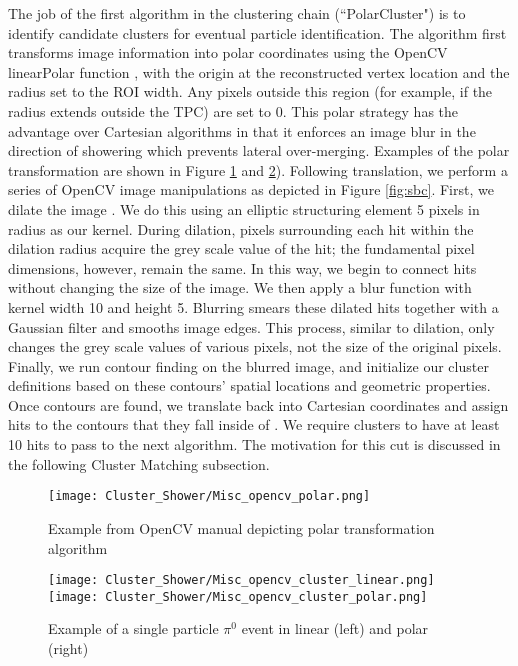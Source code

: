 \par The job of the first algorithm in the clustering chain (``PolarCluster") is to identify candidate clusters for eventual particle identification. The algorithm first transforms image information into polar coordinates using the OpenCV linearPolar function \cite{bib:linearPolar}, with the origin at the reconstructed vertex location and the radius set to the ROI width.  Any pixels outside this region (for example, if the radius extends outside the TPC) are set to 0. This polar strategy has the advantage over Cartesian algorithms in that it enforces an image blur in the direction of showering which prevents lateral over-merging. Examples of the polar transformation are shown in Figure \ref{fig:polar} and \ref{fig:pi0_polar}). Following translation, we perform a series of OpenCV image manipulations as depicted in Figure \ref{fig:sbc}. First, we dilate the image \cite{bib:dilate}. We do this using an elliptic structuring element \cite{bib:structuringElement} 5 pixels in radius as our kernel. During dilation, pixels surrounding each hit within the dilation radius acquire the grey scale value of the hit; the fundamental pixel dimensions, however, remain the same. In this way, we begin to connect hits without changing the size of the image. We then apply a blur function \cite{bib:blur} with kernel width 10 and height 5. Blurring smears these dilated hits together with a Gaussian filter and smooths image edges. This process, similar to dilation, only changes the grey scale values of various pixels, not the size of the original pixels. Finally, we run contour finding \cite{bib:contourFinding} on the blurred image, and initialize our cluster definitions based on these contours' spatial locations and geometric properties.  Once contours are found, we translate back into Cartesian coordinates and assign hits to the contours that they fall inside of \cite{bib:pointPolygon}.  We require clusters to have at least 10 hits to pass to the next algorithm. The motivation for this cut is discussed in the following Cluster Matching subsection.

\begin{figure}[H]
\centering
\texttt{[image: Cluster\_Shower/Misc\_opencv\_polar.png]}
\caption{ Example from OpenCV manual depicting polar transformation algorithm \cite{bib:linearPolar}}
\label{fig:polar}
\end{figure}

\begin{figure}[h!]
\centering
\texttt{[image: Cluster\_Shower/Misc\_opencv\_cluster\_linear.png]}
\texttt{[image: Cluster\_Shower/Misc\_opencv\_cluster\_polar.png]}
\caption{ Example of a single particle $\pi^0$ event in linear (left) and polar (right)}
\label{fig:pi0_polar}
\end{figure}


